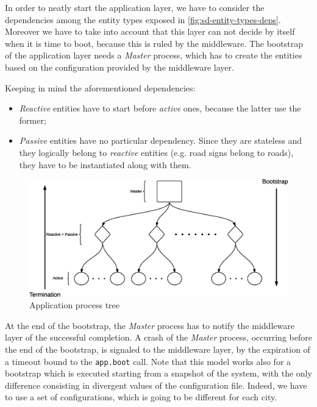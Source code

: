 In order to neatly start the application layer, we have to consider the
dependencies among the entity types exposed in \ref{fig:sd-entity-types-deps}.
Moreover we have to take into account that this layer can not decide by itself
when it is time to boot, because this is ruled by the middleware.
The bootstrap of the application layer needs a \textit{Master} process,
which has to create the entities based on the configuration provided by
the middleware layer.

Keeping in mind the aforementioned dependencies:
\begin{itemize}
  \item \textit{Reactive} entities have to start before \textit{active}
ones, because the latter use the former;
  \item \textit{Passive} entities have no particular dependency. Since
they are stateless and they logically belong to \textit{reactive} entities
(e.g. road signs belong to roads), they have to be instantiated along with them.
\end{itemize}

\begin{figure}[H]
  \centering
  \includegraphics[width=\columnwidth]{images/solution/app_proc_tree.eps}
  \caption{Application process tree}
  \label{fig:app-proc-tree}
\end{figure}

At the end of the bootstrap, the \textit{Master} process has to notify the
middleware layer of the successful completion. A crash of the
\textit{Master} process, occurring before the end of the bootstrap,
is signaled to the middleware layer, by the expiration of a timeout bound to
the \texttt{app.boot} call.
Note that this model works also for a bootstrap which is executed starting
from a snapshot of the system, with the only difference consisting in divergent
values of the configuration file. Indeed, we have to use a set of
configurations, which is going to be different for each city.